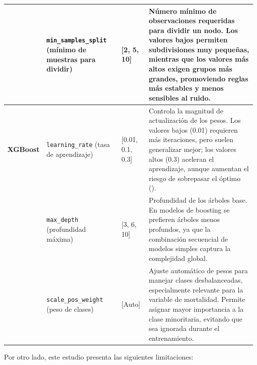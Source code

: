 \begin{table}[htbp]
\begin{tabular}{|l|l|l|l|}
\parbox[t]{2.5cm}{} & \parbox[t]{3.0cm}{\texttt{min\_samples\_split} (mínimo de muestras para dividir)} & \parbox[t]{2.5cm}{[2, 5, 10]} & \parbox[t]{7.0cm}{Número mínimo de observaciones requeridas para dividir un nodo. Los valores bajos permiten subdivisiones muy pequeñas, mientras que los valores más altos exigen grupos más grandes, promoviendo reglas más estables y menos sensibles al ruido.} \\ \hline

\parbox[t]{2.5cm}{\textbf{XGBoost}} & \parbox[t]{3.0cm}{\texttt{learning\_rate} (tasa de aprendizaje)} & \parbox[t]{2.5cm}{[0.01, 0.1, 0.3]} & \parbox[t]{7.0cm}{Controla la magnitud de actualización de los pesos. Los valores bajos (0.01) requieren más iteraciones, pero suelen generalizar mejor; los valores altos (0.3) aceleran el aprendizaje, aunque aumentan el riesgo de sobrepasar el óptimo (\cite{chen2016xgboost}).} \\ \hline

\parbox[t]{2.5cm}{} & \parbox[t]{3.0cm}{\texttt{max\_depth} (profundidad máxima)} & \parbox[t]{2.5cm}{[3, 6, 10]} & \parbox[t]{7.0cm}{Profundidad de los árboles base. En modelos de boosting se prefieren árboles menos profundos, ya que la combinación secuencial de modelos simples captura la complejidad global.} \\ \hline

\parbox[t]{2.5cm}{} & \parbox[t]{3.0cm}{\texttt{scale\_pos\_weight} (peso de clases)} & \parbox[t]{2.5cm}{[Auto]} & \parbox[t]{7.0cm}{Ajuste automático de pesos para manejar clases desbalanceadas, especialmente relevante para la variable de mortalidad. Permite asignar mayor importancia a la clase minoritaria, evitando que sea ignorada durante el entrenamiento.} \\ \hline
\end{tabular}
\end{table}

Por otro lado, este estudio presenta las siguientes limitaciones:

